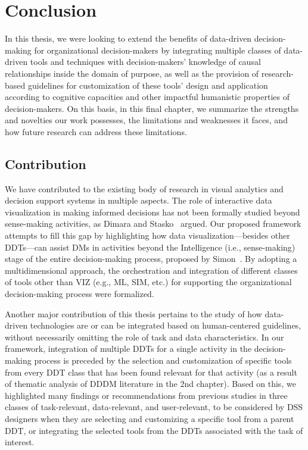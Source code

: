 \documentclass{sfuthesis}
\begin{document}
\chapter{Conclusion}
In this thesis, we were looking to extend the benefits of data-driven decision-making for organizational decision-makers by integrating multiple classes of data-driven tools and techniques with decision-makers’ knowledge of causal relationships inside the domain of purpose, as well as the provision of research-based guidelines for customization of these tools’ design and application according to cognitive capacities and other impactful humanistic properties of decision-makers. On this basis, in this final chapter, we summarize the strengths and novelties our work possesses, the limitations and weaknesses it faces, and how future research can address these limitations.
\section{Contribution}
We have contributed to the existing body of research in visual analytics and decision support systems in multiple aspects. The role of interactive data visualization in making informed decisions has not been formally studied beyond sense-making activities, as Dimara and Stasko~\cite{dimara_critical_2022} argued. Our proposed framework attempts to fill this gap by highlighting how data visualization—besides other DDTs—can assist DMs in activities beyond the Intelligence (i.e., sense-making) stage of the entire decision-making process, proposed by Simon~\cite{simon1960new}. By adopting a multidimensional approach, the orchestration and integration of different classes of tools other than VIZ (e.g., ML, SIM, etc.) for supporting the organizational decision-making process were formalized.\par
Another major contribution of this thesis pertains to the study of how data-driven technologies are or can be integrated based on human-centered guidelines, without necessarily omitting the role of task and data characteristics. In our framework, integration of multiple DDTs for a single activity in the decision-making process is preceded by the selection and customization of specific tools from every DDT class that has been found relevant for that activity (as a result of thematic analysis of DDDM literature in the 2nd chapter). Based on this, we highlighted many findings or recommendations from previous studies in three classes of task-relevant, data-relevant, and user-relevant, to be considered by DSS designers when they are selecting and customizing a specific tool from a parent DDT, or integrating the selected tools from the DDTs associated with the task of interest.\par
\end{document}
